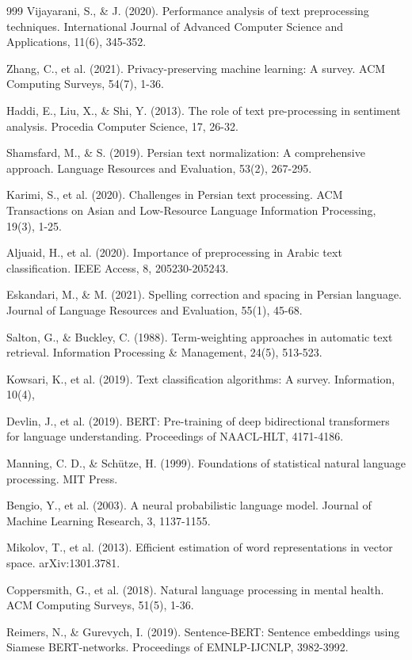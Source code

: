 \begin{thebibliography}{999}
 Vijayarani, S., \& J. (2020). Performance analysis of text preprocessing techniques. International Journal of Advanced Computer Science and Applications, 11(6), 345-352.

 Zhang, C., et al. (2021). Privacy-preserving machine learning: A survey. ACM Computing Surveys, 54(7), 1-36.

 Haddi, E., Liu, X., \& Shi, Y. (2013). The role of text pre-processing in sentiment analysis. Procedia Computer Science, 17, 26-32.

 Shamsfard, M., \& S. (2019). Persian text normalization: A comprehensive approach. Language Resources and Evaluation, 53(2), 267-295.

 Karimi, S., et al. (2020). Challenges in Persian text processing. ACM Transactions on Asian and Low-Resource Language Information Processing, 19(3), 1-25.

 Aljuaid, H., et al. (2020). Importance of preprocessing in Arabic text classification. IEEE Access, 8, 205230-205243.

 Eskandari, M., \& M. (2021). Spelling correction and spacing in Persian language. Journal of Language Resources and Evaluation, 55(1), 45-68.

 Salton, G., \& Buckley, C. (1988). Term-weighting approaches in automatic text retrieval. Information Processing \& Management, 24(5), 513-523.

 Kowsari, K., et al. (2019). Text classification algorithms: A survey. Information, 10(4),

 Devlin, J., et al. (2019). BERT: Pre-training of deep bidirectional transformers for language understanding. Proceedings of NAACL-HLT, 4171-4186.

 Manning, C. D., \& Schütze, H. (1999). Foundations of statistical natural language processing. MIT Press.

 Bengio, Y., et al. (2003). A neural probabilistic language model. Journal of Machine Learning Research, 3, 1137-1155.

 Mikolov, T., et al. (2013). Efficient estimation of word representations in vector space. arXiv:1301.3781.

 Coppersmith, G., et al. (2018). Natural language processing in mental health. ACM Computing Surveys, 51(5), 1-36.

 Reimers, N., \& Gurevych, I. (2019). Sentence-BERT: Sentence embeddings using Siamese BERT-networks. Proceedings of EMNLP-IJCNLP, 3982-3992.


\end{thebibliography}
